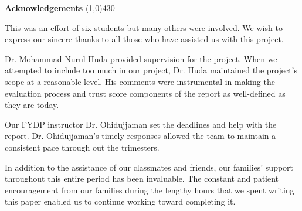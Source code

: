 \begin{center}
    {\huge \bf Acknowledgements}
    \line(1,0){430}
\end{center}

This was an effort of six students but many others were involved. We wish to express our sincere thanks to all those who have assisted us with this project.

Dr. Mohammad Nurul Huda provided supervision for the project. When we attempted to include too much in our project, Dr. Huda maintained the project's scope at a reasonable level. His comments were instrumental in making the evaluation process and trust score components of the report as well-defined as they are today.

Our FYDP instructor Dr. Ohidujjaman set the deadlines and help with the report. Dr. Ohidujjaman’s timely responses allowed the team to maintain a consistent pace through out the trimesters.

In addition to the assistance of our classmates and friends, our families’ support throughout this entire period has been invaluable. The constant and patient encouragement from our families during the lengthy hours that we spent writing this paper enabled us to continue working toward completing it.
